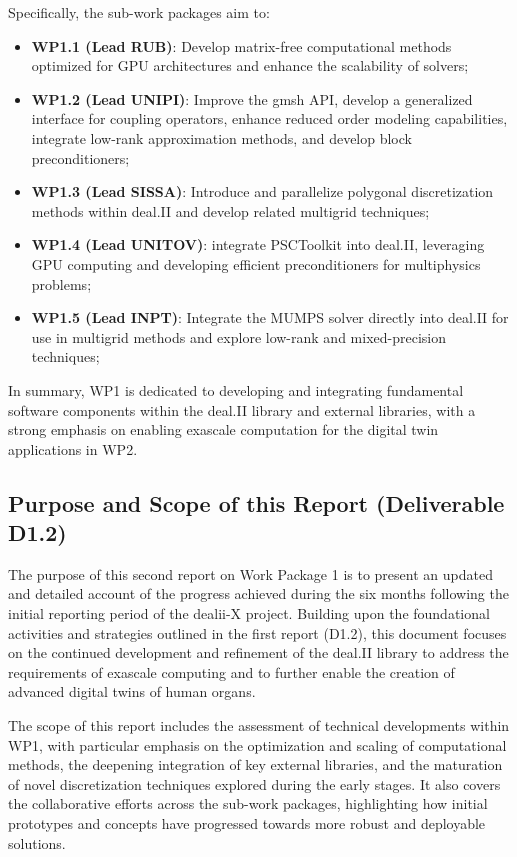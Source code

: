 \documentclass[a4paper,12pt]{article}
\begin{document}
Specifically, the sub-work packages aim to:
\begin{itemize}
    \item \textbf{WP1.1 (Lead RUB)}: Develop matrix-free computational methods optimized for GPU architectures and enhance the scalability of solvers;
    \item \textbf{WP1.2 (Lead UNIPI)}: Improve the gmsh API, develop a generalized interface for coupling operators, enhance reduced order modeling capabilities, integrate low-rank approximation methods, and develop block preconditioners;
    \item \textbf{WP1.3 (Lead SISSA)}: Introduce and parallelize polygonal discretization methods within deal.II and develop related multigrid techniques;
    \item \textbf{WP1.4 (Lead UNITOV)}: integrate PSCToolkit into deal.II, leveraging GPU computing and developing efficient preconditioners for multiphysics problems;
    \item \textbf{WP1.5 (Lead INPT)}: Integrate the MUMPS solver directly into deal.II for use in multigrid methods and explore low-rank and mixed-precision techniques;
\end{itemize}

In summary, WP1 is dedicated to developing and integrating fundamental software components within the deal.II library and external libraries, with a strong emphasis on enabling exascale computation for the digital twin applications in WP2.

\subsection{Purpose and Scope of this Report (Deliverable D1.2)}

The purpose of this second report on Work Package 1 is to present an updated and detailed account of the progress achieved during the six months following the initial reporting period of the dealii-X project. Building upon the foundational activities and strategies outlined in the first report (D1.2), this document focuses on the continued development and refinement of the deal.II library to address the requirements of exascale computing and to further enable the creation of advanced digital twins of human organs.

The scope of this report includes the assessment of technical developments within WP1, with particular emphasis on the optimization and scaling of computational methods, the deepening integration of key external libraries, and the maturation of novel discretization techniques explored during the early stages. It also covers the collaborative efforts across the sub-work packages, highlighting how initial prototypes and concepts have progressed towards more robust and deployable solutions.
\end{document}
